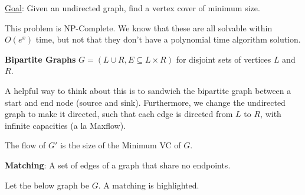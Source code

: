 \documentclass[10pt,landscape]{article}
\newcommand{\definition}[1]{\textbf{#1}\hspace{2pt}}
\begin{document}
\begin{multicols}{3}
\underline{Goal}: Given an undirected graph, find a vertex cover of minimum size.

This problem is NP-Complete. We know that these are all solvable within $O(e^x)$ time, but not that they don't have a polynomial time algorithm solution.

\definition{Bipartite Graphs} $G = (L \cup R, E \subseteq L \times R)$ for disjoint sets of vertices $L$ and $R$.

A helpful way to think about this is to sandwich the bipartite graph between a start and end node (source and sink). Furthermore, we change the undirected graph to make it directed, such that each edge is directed from $L$ to $R$, with infinite capacities (a la Maxflow).

\begin{center}
\end{center}

The flow of $G'$ is the size of the Minimum VC of $G$.

\definition{Matching}: A set of edges of a graph that share no endpoints.

Let the below graph be $G$. A matching is highlighted.

\begin{center}
\end{center}
\end{multicols}
\end{document}
